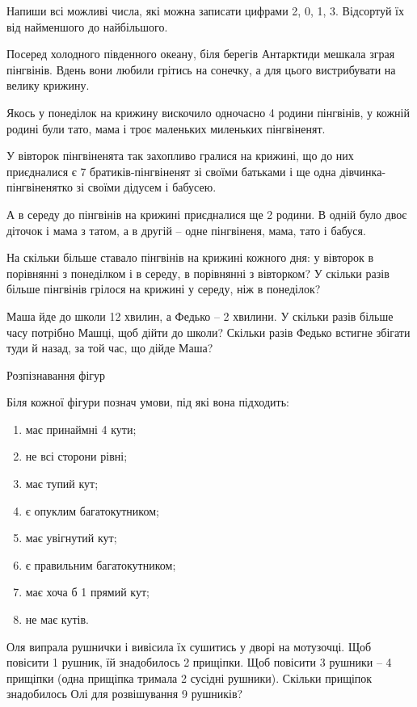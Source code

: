 \problem
Напиши всі можливі числа, які можна записати цифрами 2, 0, 1, 3.
Відсортуй їх від найменшого до найбільшого.


\problem
Посеред холодного південного океану, біля берегів Антарктиди мешкала
зграя пінгвінів. Вдень вони любили грітись на сонечку, а для цього
вистрибувати на велику крижину.

Якось у понеділок на крижину вискочило одночасно 4 родини пінгвінів,
у кожній родині були тато, мама і троє маленьких миленьких пінгвіненят.

У вівторок пінгвіненята так захопливо гралися на крижині,
що до них приєдналися є 7 братиків-пінгвіненят зі своїми батьками
і ще одна дівчинка-пінгвіненятко зі своїми дідусем і бабусею.

А в середу до пінгвінів на крижині приєдналися ще 2 родини.
В одній було двоє діточок і мама з татом, а в другій – 
одне пінгвіненя, мама, тато і бабуся.

На скільки більше ставало пінгвінів на крижині кожного дня:
у вівторок в порівнянні з понеділком і в середу, в порівнянні з вівторком?
У скільки разів більше пінгвінів грілося на крижині у середу, ніж в понеділок?


\problem
Маша йде до школи 12 хвилин, а Федько – 2 хвилини.
У скільки разів більше часу потрібно Машці, щоб дійти до школи?
Скільки разів Федько встигне збігати туди й назад, за той час, що дійде Маша?


\problem
Розпізнавання фігур

Біля кожної фігури познач умови, під які вона підходить:
\begin{enumerate}
    \item має принаймні 4 кути;
    \item не всі сторони рівні;
    \item має тупий кут;
    \item є опуклим багатокутником;
    \item має увігнутий кут;
    \item є правильним багатокутником;
    \item має хоча б 1 прямий кут;
    \item не має кутів.
\end{enumerate}


\problem
Оля випрала рушнички і вивісила їх сушитись у дворі на мотузочці.
Щоб повісити 1 рушник, їй знадобилось 2 прищіпки.
Щоб повісити 3 рушники – 4 прищіпки (одна прищіпка тримала 2 сусідні рушники).
Скільки прищіпок знадобилось Олі для розвішування 9 рушників?


